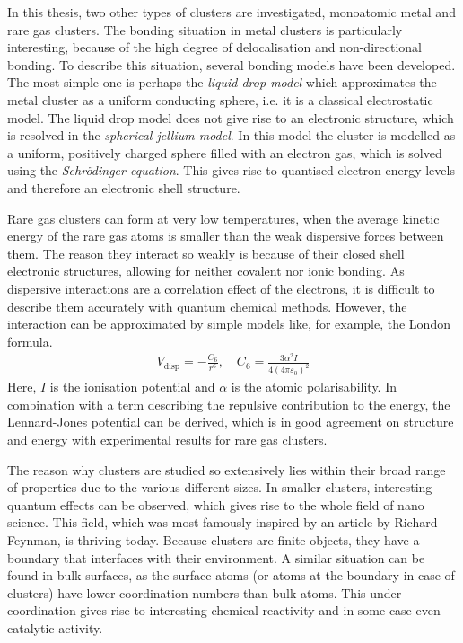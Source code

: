 In this thesis, two other types of clusters are investigated, monoatomic metal
and rare gas clusters. The bonding situation in metal clusters is particularly
interesting, because of the high degree of delocalisation and non-directional
bonding. To describe this situation, several bonding models have been developed.
The most simple one is perhaps the \emph{liquid drop model} which approximates
the metal cluster as a uniform conducting sphere, i.e. it is a classical
electrostatic model. The liquid drop model does not give rise to an electronic
structure, which is resolved in the \textit{spherical jellium model}. In this
model the cluster is modelled as a uniform, positively charged sphere filled
with an electron gas, which is solved using the \textit{Schr\"odinger equation}.
This gives rise to quantised electron energy levels and therefore an electronic
shell structure.

Rare gas clusters can form at very low temperatures, when the average kinetic
energy of the rare gas atoms is smaller than the weak dispersive forces between
them. The reason they interact so weakly is because of their closed shell
electronic structures, allowing for neither covalent nor ionic bonding. As
dispersive interactions are a correlation effect of the electrons, it is
difficult to describe them accurately with quantum chemical methods. However,
the interaction can be approximated by simple models like, for example, the
London formula.
%
\begin{align}
    V_\text{disp}=-\frac{C_6}{r^6},\quad C_6=\frac{3\alpha^2I}{4\left(4\pi\varepsilon_0\right)^2}
\end{align}
Here, $I$ is the ionisation potential and $\alpha$ is the atomic polarisability.
In combination with a term describing the repulsive contribution to the energy,
the Lennard-Jones potential can be derived, which is in good agreement on
structure and energy with experimental results for rare gas clusters.

The reason why clusters are studied so extensively lies within their broad range
of properties due to the various different sizes. In smaller clusters,
interesting quantum effects can be observed, which gives rise to the whole field
of nano science. This field, which was most famously inspired by an article by
Richard Feynman,\autocite{Feynman_TherePlentyRoom_1960} is thriving today.
Because clusters are finite objects, they have a boundary that interfaces with
their environment. A similar situation can be found in bulk surfaces, as the
surface atoms (or atoms at the boundary in case of clusters) have lower
coordination numbers than bulk atoms. This under-coordination gives rise to
interesting chemical reactivity and in some case even catalytic activity.

